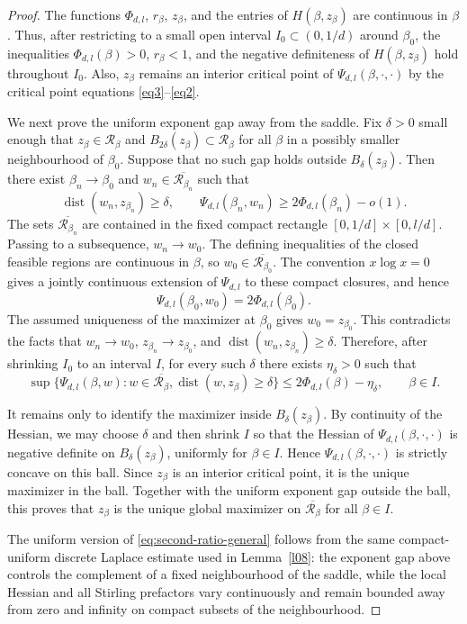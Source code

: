 \documentclass[11pt]{amsart}
\theoremstyle{plain}
\numberwithin{equation}{section}
\numberwithin{theorem}{section}
\numberwithin{figure}{section}
\begin{document}
\begin{proof}
The functions \(\Phi_{d,l}\), \(r_\beta\), \(z_\beta\), and the entries of
\(H(\beta,z_\beta)\) are continuous in \(\beta\).  Thus, after restricting to a
small open interval \(I_0\subset(0,1/d)\) around \(\beta_0\), the inequalities
\(\Phi_{d,l}(\beta)>0\), \(r_\beta<1\), and the negative definiteness of
\(H(\beta,z_\beta)\) hold throughout \(I_0\).  Also, \(z_\beta\) remains an
interior critical point of \(\Psi_{d,l}(\beta,\cdot,\cdot)\) by the critical
point equations \eqref{eq3}--\eqref{eq2}.

We next prove the uniform exponent gap away from the saddle.  Fix
\(\delta>0\) small enough that \(z_\beta\in\mathcal R_\beta\) and
\(B_{2\delta}(z_\beta)\subset\mathcal R_\beta\) for all \(\beta\) in a possibly
smaller neighbourhood of \(\beta_0\).  Suppose that no such gap holds outside
\(B_\delta(z_\beta)\).  Then there exist \(\beta_n\to\beta_0\) and
\(w_n\in\overline{\mathcal R_{\beta_n}}\) such that
\[
  \operatorname{dist}(w_n,z_{\beta_n})\ge\delta,
  \qquad
  \Psi_{d,l}(\beta_n,w_n)
  \ge 2\Phi_{d,l}(\beta_n)-o(1).
\]
The sets \(\overline{\mathcal R_{\beta_n}}\) are contained in the fixed compact
rectangle \([0,1/d]\times[0,l/d]\).  Passing to a subsequence, \(w_n\to w_0\).
The defining inequalities of the closed feasible regions are continuous in
\(\beta\), so \(w_0\in\overline{\mathcal R_{\beta_0}}\).  The convention
\(x\log x=0\) gives a jointly continuous extension of \(\Psi_{d,l}\) to these
compact closures, and hence
\[
  \Psi_{d,l}(\beta_0,w_0)=2\Phi_{d,l}(\beta_0).
\]
The assumed uniqueness of the maximizer at \(\beta_0\) gives
\(w_0=z_{\beta_0}\).  This contradicts the facts that \(w_n\to w_0\),
\(z_{\beta_n}\to z_{\beta_0}\), and
\(\operatorname{dist}(w_n,z_{\beta_n})\ge\delta\).  Therefore, after shrinking
\(I_0\) to an interval \(I\), for every such \(\delta\) there exists
\(\eta_\delta>0\) such that
\[
  \sup\{\Psi_{d,l}(\beta,w):
        w\in\overline{\mathcal R_\beta},
        \operatorname{dist}(w,z_\beta)\ge\delta\}
  \le 2\Phi_{d,l}(\beta)-\eta_\delta,
  \qquad \beta\in I .
\]

It remains only to identify the maximizer inside \(B_\delta(z_\beta)\).  By
continuity of the Hessian, we may choose \(\delta\) and then shrink \(I\) so
that the Hessian of \(\Psi_{d,l}(\beta,\cdot,\cdot)\) is negative definite on
\(B_\delta(z_\beta)\), uniformly for \(\beta\in I\).  Hence
\(\Psi_{d,l}(\beta,\cdot,\cdot)\) is strictly concave on this ball.  Since
\(z_\beta\) is an interior critical point, it is the unique maximizer in the
ball.  Together with the uniform exponent gap outside the ball, this proves that
\(z_\beta\) is the unique global maximizer on \(\overline{\mathcal R_\beta}\) for
all \(\beta\in I\).

The uniform version of \eqref{eq:second-ratio-general} follows from the same
compact-uniform discrete Laplace estimate used in Lemma~\ref{l08}: the exponent
gap above controls the complement of a fixed neighbourhood of the saddle, while
the local Hessian and all Stirling prefactors vary continuously and remain
bounded away from zero and infinity on compact subsets of the neighbourhood.
\end{proof}
\end{document}
